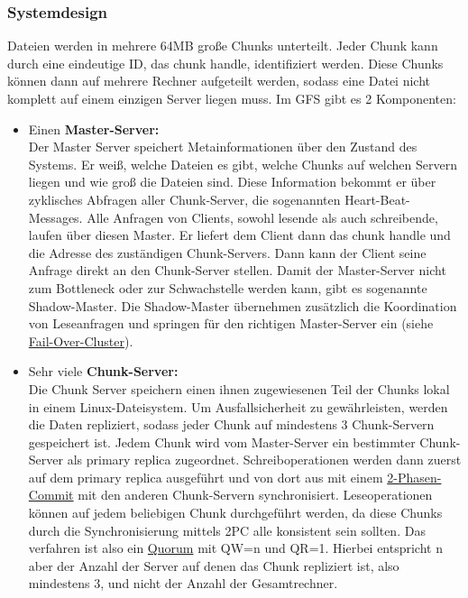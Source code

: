 \subsubsection*{Systemdesign}

Dateien werden in mehrere 64MB große Chunks unterteilt. Jeder Chunk kann durch eine eindeutige ID, das chunk handle, identifiziert werden. Diese Chunks können dann auf mehrere Rechner aufgeteilt werden, sodass eine Datei nicht komplett auf einem einzigen Server liegen muss. Im GFS gibt es 2 Komponenten:
\begin{itemize}
    \item Einen \textbf{Master-Server:}\\
          Der Master Server speichert Metainformationen über den Zustand des Systems. Er weiß, welche Dateien es gibt, welche Chunks auf welchen Servern liegen und wie groß die Dateien sind. Diese Information bekommt er über zyklisches Abfragen aller Chunk-Server, die sogenannten Heart-Beat-Messages. Alle Anfragen von Clients, sowohl lesende als auch schreibende, laufen über diesen Master. Er liefert dem Client dann das chunk handle und die Adresse des zuständigen Chunk-Servers. Dann kann der Client seine Anfrage direkt an den Chunk-Server stellen. Damit der Master-Server nicht zum Bottleneck oder zur Schwachstelle werden kann, gibt es sogenannte Shadow-Master. Die Shadow-Master übernehmen zusätzlich die Koordination von Leseanfragen und springen für den richtigen Master-Server ein (siehe \hyperref[sec:fail-over-cluster]{Fail-Over-Cluster}).
    \item Sehr viele \textbf{Chunk-Server:}\\
          Die Chunk Server speichern einen ihnen zugewiesenen Teil der Chunks lokal in einem Linux-Dateisystem. Um Ausfallsicherheit zu gewährleisten, werden die Daten repliziert, sodass jeder Chunk auf mindestens 3 Chunk-Servern gespeichert ist. Jedem Chunk wird vom Master-Server ein bestimmter Chunk-Server als primary replica zugeordnet. Schreiboperationen werden dann zuerst auf dem primary replica ausgeführt und von dort aus mit einem \hyperref[sec:2pc]{2-Phasen-Commit} mit den anderen Chunk-Servern synchronisiert. Leseoperationen können auf jedem beliebigen Chunk durchgeführt werden, da diese Chunks durch die Synchronisierung mittels 2PC alle konsistent sein sollten. Das verfahren ist also ein \hyperref[sec:quorums]{Quorum} mit QW=n und QR=1. Hierbei entspricht n aber der Anzahl der Server auf denen das Chunk repliziert ist, also mindestens 3, und nicht der Anzahl der Gesamtrechner.
\end{itemize}

